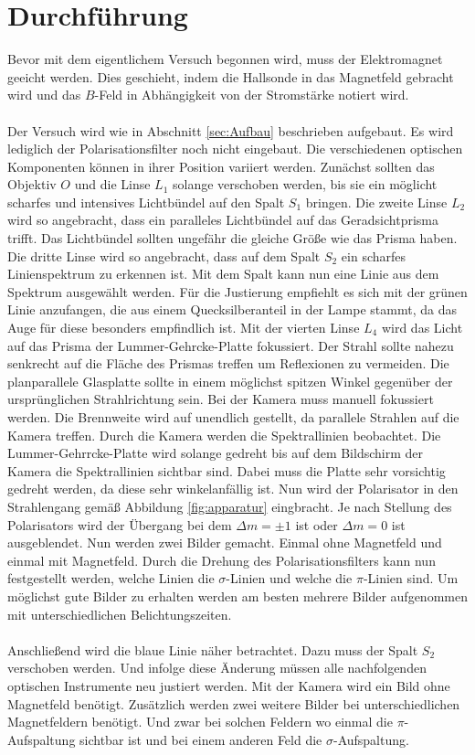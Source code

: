 \section{Durchführung}
\label{sec:Durchführung}
Bevor mit dem eigentlichem Versuch begonnen wird, muss der Elektromagnet geeicht werden.
Dies geschieht, indem die Hallsonde in das Magnetfeld gebracht wird und das $B$-Feld
in Abhängigkeit von der Stromstärke notiert wird.\\
\\
Der Versuch wird wie in Abschnitt \ref{sec:Aufbau} beschrieben aufgebaut. Es wird
lediglich der Polarisationsfilter noch nicht eingebaut. Die
verschiedenen optischen Komponenten können in ihrer Position variiert werden.
Zunächst sollten das Objektiv $O$ und die Linse $L_\text{1}$ solange verschoben
werden, bis sie ein möglicht scharfes und intensives Lichtbündel auf den
Spalt $S_\text{1}$ bringen. Die zweite Linse $L_\text{2}$ wird so angebracht, dass
ein paralleles Lichtbündel auf das Geradsichtprisma trifft. Das Lichtbündel
sollten ungefähr die gleiche Größe wie das Prisma haben. Die dritte Linse wird so
angebracht, dass auf dem Spalt $S_\text{2}$ ein scharfes Linienspektrum zu erkennen ist.
Mit dem Spalt kann nun eine Linie aus dem Spektrum ausgewählt werden. Für die
Justierung empfiehlt es sich mit der grünen Linie anzufangen, die aus einem
Quecksilberanteil in der Lampe stammt, da das Auge für diese besonders empfindlich ist.
Mit der vierten Linse $L_\text{4}$ wird das Licht auf das Prisma
der Lummer-Gehrcke-Platte fokussiert. Der Strahl sollte nahezu senkrecht auf die
Fläche des Prismas treffen um Reflexionen zu vermeiden. Die planparallele
Glasplatte sollte in einem möglichst
spitzen Winkel gegenüber der ursprünglichen Strahlrichtung sein. Bei der Kamera
muss manuell fokussiert werden. Die Brennweite wird auf unendlich gestellt, da
parallele Strahlen auf die Kamera treffen. Durch die Kamera
werden die Spektrallinien beobachtet. Die Lummer-Gehrrcke-Platte wird solange
gedreht bis auf dem Bildschirm der Kamera die Spektrallinien sichtbar sind. Dabei muss
die Platte sehr vorsichtig gedreht werden, da diese sehr winkelanfällig ist.
Nun wird der Polarisator in den Strahlengang gemäß Abbildung \ref{fig:apparatur}
eingbracht. Je nach Stellung des Polarisators wird der Übergang bei dem $\Delta m = \pm 1$
ist oder $\Delta m = 0$ ist ausgeblendet. Nun werden zwei Bilder gemacht. Einmal
ohne Magnetfeld und einmal mit Magnetfeld. Durch die Drehung des Polarisationsfilters
kann nun festgestellt werden, welche Linien die $\sigma$-Linien und welche die
$\pi$-Linien sind. Um möglichst gute Bilder zu erhalten werden am besten mehrere Bilder
aufgenommen mit unterschiedlichen Belichtungszeiten.\\
\\
Anschließend wird die blaue Linie näher betrachtet. Dazu muss der Spalt $S_\text{2}$
verschoben werden. Und infolge diese Änderung müssen alle nachfolgenden optischen
Instrumente neu justiert werden. Mit der Kamera wird ein Bild ohne Magnetfeld benötigt.
Zusätzlich werden zwei weitere Bilder bei unterschiedlichen Magnetfeldern benötigt.
Und zwar bei solchen Feldern wo einmal die $\pi$-Aufspaltung sichtbar ist und bei
einem anderen Feld die $\sigma$-Aufspaltung.

